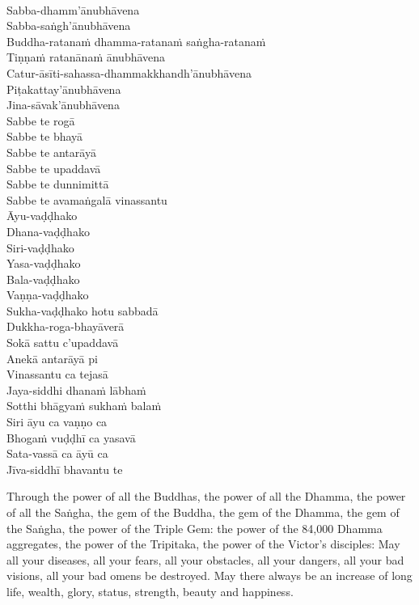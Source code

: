 \begin{pali-hang}
\\
Sabba-dhamm'ānubhāvena\\
Sabba-saṅgh'ānubhāvena\\
Buddha-ratanaṁ dhamma-ratanaṁ saṅgha-ratanaṁ\\
Tiṇṇaṁ ratanānaṁ ānubhāvena\\
Catur-āsīti-sahassa-dhammakkhandh'ānubhāvena\\
Piṭakattay'ānubhāvena\\
Jina-sāvak'ānubhāvena\\
Sabbe te rogā\\
Sabbe te bhayā\\
Sabbe te antarāyā\\
Sabbe te upaddavā\\
Sabbe te dunnimittā\\
Sabbe te avamaṅgalā vinassantu\\
Āyu-vaḍḍhako\\
Dhana-vaḍḍhako\\
Siri-vaḍḍhako\\
Yasa-vaḍḍhako\\
Bala-vaḍḍhako\\
Vaṇṇa-vaḍḍhako\\
Sukha-vaḍḍhako hotu sabbadā\\
Dukkha-roga-bhayāverā\\
Sokā sattu c'upaddavā\\
Anekā antarāyā pi\\
Vinassantu ca tejasā\\
Jaya-siddhi dhanaṁ lābhaṁ\\
Sotthi bhāgyaṁ sukhaṁ balaṁ\\
Siri āyu ca vaṇṇo ca\\
Bhogaṁ vuḍḍhī ca yasavā\\
Sata-vassā ca āyū ca\\
Jīva-siddhī bhavantu te
\end{pali-hang}

\begin{english-hang}
  Through the power of all the Buddhas, the power of all the Dhamma, the power of all the Saṅgha, the gem of the Buddha, the gem of the Dhamma, the gem of the Saṅgha, the power of the Triple Gem: the power of the 84,000 Dhamma aggregates, the power of the Tripitaka, the power of the Victor's disciples: May all your diseases, all your fears, all your obstacles, all your dangers, all your bad visions, all your bad omens be destroyed. May there always be an increase of long life, wealth, glory, status, strength, beauty and happiness.
\end{english-hang}

